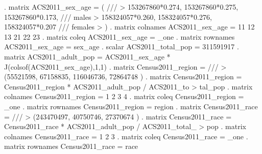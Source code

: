 . matrix ACS2011_sex_age = ( ///
>     153267860*0.274, 153267860*0.275, 153267860*0.173, /// males
>     158324057*0.260, 158324057*0.276, 158324057*0.207  /// females
> )
{\smallskip}
. matrix colnames ACS2011_sex_age = 11 12 13 21 22 23
{\smallskip}
. matrix coleq    ACS2011_sex_age = _one
{\smallskip}
. matrix rownames ACS2011_sex_age = sex_age
{\smallskip}
. scalar ACS2011_total_pop = 311591917
{\smallskip}
. matrix ACS2011_adult_pop = ACS2011_sex_age * J(colsof(ACS2011_sex_age),1,1)
{\smallskip}
. matrix Census2011_region = ///
>     (55521598, 67158835, 116046736, 72864748 )
{\smallskip}
. matrix Census2011_region = Census2011_region * ACS2011_adult_pop / ACS2011_to
> tal_pop
{\smallskip}
. matrix colnames Census2011_region = 1 2 3 4
{\smallskip}
. matrix coleq    Census2011_region = _one
{\smallskip}
. matrix rownames Census2011_region = region
{\smallskip}
. matrix Census2011_race = ///
>     (243470497, 40750746, 27370674 )
{\smallskip}
\cnp
. matrix Census2011_race = Census2011_race * ACS2011_adult_pop / ACS2011_total_
> pop
{\smallskip}
. matrix colnames Census2011_race = 1 2 3
{\smallskip}
. matrix coleq    Census2011_race = _one
{\smallskip}
. matrix rownames Census2011_race = race
{\smallskip}

